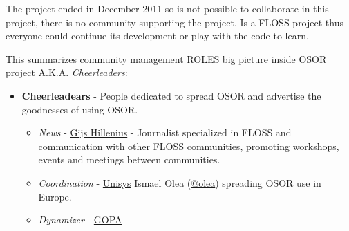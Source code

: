 \par The project ended in December 2011 so is not possible to collaborate in this project, there is no community supporting the project. Is a FLOSS project thus everyone could continue its development or play with the code to learn.

\par This summarizes community management ROLES big picture inside OSOR project A.K.A. \textit{Cheerleaders}:

\begin{itemize}
	\item \textbf{Cheerleadears} - People dedicated to spread OSOR and advertise the goodnesses of using OSOR.
\begin{itemize}
	\item \textit{News} - \href{https://twitter.com/Sjig}{Gijs Hillenius} - Journalist specialized in FLOSS and communication with other FLOSS communities, promoting workshops, events and meetings between communities.
	\item \textit{Coordination} - \href{http://www.unisys.com/unisys/}{Unisys} Ismael Olea (\href{https://twitter.com/olea}{@olea}) spreading OSOR use in Europe.
	\item \textit{Dynamizer} - \href{http://www.gopa-cartermill.com/}{GOPA}
\end{itemize}
\end{itemize}

